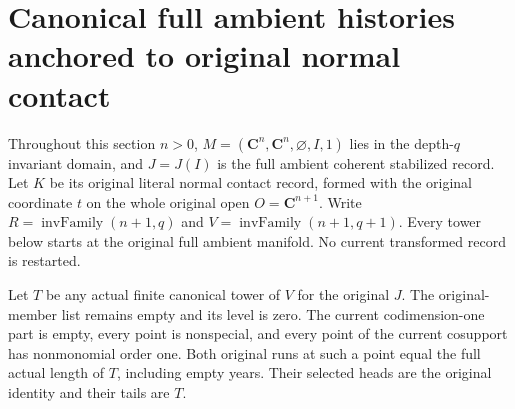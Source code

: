 \section{Canonical full ambient histories anchored to original normal contact}

Throughout this section $n>0$, $M=(\mathbf C^n,\mathbf C^n,\varnothing,I,1)$
lies in the depth-$q$ invariant domain, and $J=J(I)$ is the full ambient
coherent stabilized record. Let $K$ be its original literal normal contact
record, formed with the original coordinate $t$ on the whole original open
$O=\mathbf C^{n+1}$. Write $R=\operatorname{invFamily}(n+1,q)$ and
$V=\operatorname{invFamily}(n+1,q+1)$. Every tower below starts at the original
full ambient manifold. No current transformed record is restarted.

\begin{lemma}
\label{hir:disjoint-canonical-normal-regimes}
\leanok
Let $T$ be any actual finite canonical tower of $V$ for the original $J$.
The original-member list remains empty and its level is zero. The current
codimension-one part is empty, every point is nonspecial, and every point
of the current cosupport has nonmonomial order one. Both original runs at
such a point equal the full actual length of $T$, including empty years.
Their selected heads are the original identity and their tails are $T$.
\end{lemma}
